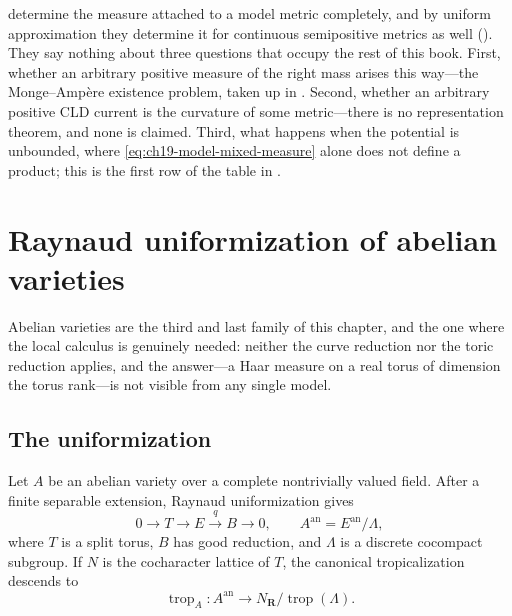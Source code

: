 \begin{remark}
\label{rem:ch19-model-scope}
 determine the
measure attached to a model metric completely, and by uniform approximation
they determine it for continuous semipositive metrics as well
().  They say nothing about three
questions that occupy the rest of this book.  First, whether an arbitrary
positive measure of the right mass arises this way---the Monge--Amp\`ere
existence problem, taken up in .  Second, whether an
arbitrary positive CLD current is the curvature of some metric---there is no
representation theorem, and none is claimed.  Third, what happens when the
potential is unbounded, where \eqref{eq:ch19-model-mixed-measure} alone
does not define a product; this is the first row of the table in
.
\end{remark}

\section{Raynaud uniformization of abelian varieties}
\label{sec:ch19-abelian}

Abelian varieties are the third and last family of this chapter, and the
one where the local calculus is genuinely needed: neither the curve
reduction nor the toric reduction applies, and the answer---a Haar measure
on a real torus of dimension the torus rank---is not visible from any single
model.

\subsection{The uniformization}
\label{sec:ch19-raynaud}

Let $A$ be an abelian variety over a complete nontrivially valued field.
After a finite separable extension, Raynaud uniformization gives
\begin{equation}
                  0\longrightarrow T\longrightarrow E
                    \stackrel{q}{\longrightarrow}B\longrightarrow0,
             \qquad A^{\mathrm{an}}=E^{\mathrm{an}}/\Lambda,
\label{eq:raynaud-uniformization}
\end{equation}
where $T$ is a split torus, $B$ has good reduction, and $\Lambda$ is
a discrete cocompact subgroup.  If $N$ is the cocharacter lattice of
$T$, the canonical tropicalization descends to
\[
                  \operatorname{trop}_A:A^{\mathrm{an}}\longrightarrow
                                      N_{\mathbf R}/\operatorname{trop}(\Lambda).
\]

